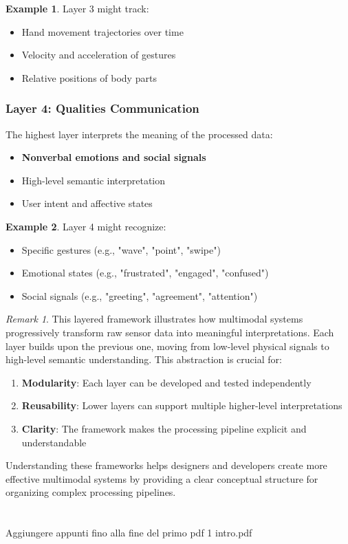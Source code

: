 \documentclass[11pt,a4paper]{article}
\theoremstyle{definition}
\newtheorem{example}{Example}[section]
\theoremstyle{plain}
\theoremstyle{remark}
\newtheorem*{remark}{Remark}
\begin{document}
\begin{example}
Layer 3 might track:
\begin{itemize}
    \item Hand movement trajectories over time
    \item Velocity and acceleration of gestures
    \item Relative positions of body parts
\end{itemize}
\end{example}

\subsubsection{Layer 4: Qualities Communication}

The highest layer interprets the meaning of the processed data:

\begin{itemize}
    \item \textbf{Nonverbal emotions and social signals}
    \item High-level semantic interpretation
    \item User intent and affective states
\end{itemize}

\begin{example}
Layer 4 might recognize:
\begin{itemize}
    \item Specific gestures (e.g., "wave", "point", "swipe")
    \item Emotional states (e.g., "frustrated", "engaged", "confused")
    \item Social signals (e.g., "greeting", "agreement", "attention")
\end{itemize}
\end{example}

\begin{remark}
This layered framework illustrates how multimodal systems progressively transform raw sensor data into meaningful interpretations. Each layer builds upon the previous one, moving from low-level physical signals to high-level semantic understanding. This abstraction is crucial for:
\begin{enumerate}
    \item \textbf{Modularity}: Each layer can be developed and tested independently
    \item \textbf{Reusability}: Lower layers can support multiple higher-level interpretations
    \item \textbf{Clarity}: The framework makes the processing pipeline explicit and understandable
\end{enumerate}

Understanding these frameworks helps designers and developers create more effective multimodal systems by providing a clear conceptual structure for organizing complex processing pipelines.
\end{remark}



\newpage

\section{}

Aggiungere appunti fino alla fine del primo pdf 1 intro.pdf
\end{document}
